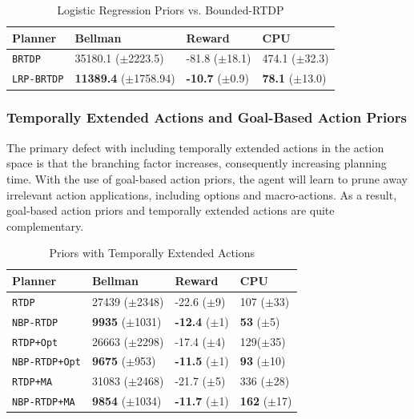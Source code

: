 \documentclass[11pt]{article}
\begin{document}
\begin{table}
\centering
{}
\small
\begin{tabular}{@{}llll@{}}\toprule
Planner & Bellman & Reward & CPU \\ \midrule
\texttt{BRTDP}   			&	35180.1 ($\pm$2223.5)		&	-81.8 ($\pm$18.1)	& 474.1 ($\pm$32.3) \\
\texttt{LRP-BRTDP} 			& 	{\bf 11389.4} ($\pm$1758.94)	&	{\bf -10.7} ($\pm$0.9)& {\bf 78.1} ($\pm$13.0) \\ \hline
\end{tabular}
\caption{Logistic Regression Priors vs. Bounded-RTDP}
\label{table:log_reg_results}
\end{table}


\subsubsection{Temporally Extended Actions and Goal-Based Action Priors}

The primary defect with including temporally extended actions in the action space is that the branching factor increases, consequently increasing planning time. With the use of goal-based action priors, the agent will learn to prune away irrelevant action applications, including options and macro-actions. As a result, goal-based action priors and temporally extended actions are quite complementary.

\begin{table}[t]
\centering
{}
\small
\begin{tabular}{@{}llll@{}}\toprule
Planner & Bellman & Reward & CPU \\ \midrule
\texttt{RTDP}   			&	27439 ($\pm$2348)		&	-22.6 ($\pm$9)		& 107 ($\pm$33) \\
\texttt{NBP-RTDP} 			& 	{\bf 9935} ($\pm$1031)	&	{\bf -12.4} ($\pm$1)& {\bf 53} ($\pm$5) \\ \hline
\texttt{RTDP+Opt}  		&	26663 ($\pm$2298)		&	-17.4 ($\pm$4) 		& 129($\pm$35) \\
\texttt{NBP-RTDP+Opt} 		& 	{\bf 9675} ($\pm$953)	&	{\bf -11.5} ($\pm$1)	&{\bf 93} ($\pm$10) \\ \hline
\texttt{RTDP+MA}  		&	31083 ($\pm$2468)		&	-21.7	 ($\pm$5)		&336 ($\pm$28) \\
\texttt{NBP-RTDP+MA}  		& 	{\bf 9854} ($\pm$1034)	&	{\bf -11.7} ($\pm$1)	&{\bf 162} ($\pm$17) \\ %
\bottomrule
\end{tabular}
\caption{Priors with Temporally Extended Actions}
\label{table:temp_ext_act_results}
\end{table}
\end{document}
